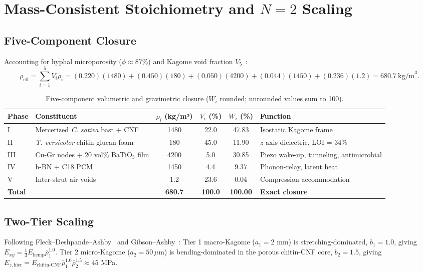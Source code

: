 \documentclass[11pt,a4paper]{article}
\theoremstyle{definition}
\theoremstyle{remark}
\begin{document}
\section{Mass-Consistent Stoichiometry and $N=2$ Scaling}

\subsection{Five-Component Closure}
Accounting for hyphal microporosity ($\phi \approx 87\%$) and Kagome void fraction $V_5$~\cite{islam2017,danninger2022}:
\begin{equation}
\rho_{\text{eff}} = \sum_{i=1}^5 V_i \rho_i = (0.220)(1480) + (0.450)(180) + (0.050)(4200) + (0.044)(1450) + (0.236)(1.2) = 680.7\ \text{kg/m}^3.
\end{equation}

\begin{table}[h!]\centering\small
\begin{tabular}{@{}llcccp{4.5cm}@{}}
\toprule
\textbf{Phase} & \textbf{Constituent} & $\rho_i$ (kg/m³) & $V_i$ (\%) & $W_i$ (\%) & \textbf{Function} \\
\midrule
I   & Mercerized \textit{C. sativa} bast + CNF & 1480 & 22.0 & 47.83 & Isostatic Kagome frame~\cite{maxwell1864,guest2003} \\
II  & \textit{T. versicolor} chitin-glucan foam & 180 & 45.0 & 11.90 & $z$-axis dielectric, LOI = 34\% \\
III & Cu-Gr nodes + 20 vol\% $\text{BaTiO}_3$ film & 4200 & 5.0 & 30.85 & Piezo wake-up, tunneling, antimicrobial \\
IV  & h-BN + C18 PCM & 1450 & 4.4 & 9.37 & Phonon-relay, latent heat \\
V   & Inter-strut air voids & 1.2 & 23.6 & 0.04 & Compression accommodation \\
\midrule
\textbf{Total} & & \textbf{680.7} & \textbf{100.0} & \textbf{100.00} & \textbf{Exact closure} \\
\bottomrule
\end{tabular}
\caption{Five-component volumetric and gravimetric closure ($W_i$ rounded; unrounded values sum to 100).}
\end{table}

\subsection{Two-Tier Scaling}
Following Fleck--Deshpande--Ashby~\cite{fleck2010} and Gibson--Ashby~\cite{gibson1997}: Tier 1 macro-Kagome ($a_1 = 2$ mm) is stretching-dominated, $b_1 = 1.0$, giving $E_{xy} = \tfrac{1}{3}E_{\text{hemp}}\bar\rho_1^{1.0}$. Tier 2 micro-Kagome ($a_2 = 50\,\mu$m) is bending-dominated in the porous chitin-CNF core, $b_2 = 1.5$, giving $E_{z,\text{hier}} = E_{\text{chitin-CNF}}\bar\rho_1^{1.0}\bar\rho_2^{1.5} \approx 45$ MPa.
\end{document}
